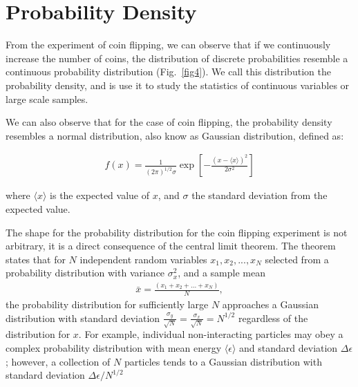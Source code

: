 \documentclass[book.tex]{subfiles}
\begin{document}
\section{Probability Density}

From the experiment of coin flipping, we can observe that if we continuously increase the number of coins, the distribution of discrete probabilities resemble a continuous probability distribution (Fig.~\ref{fig4}). We call this distribution the probability density, and is use it to study the statistics of continuous variables or large scale samples.

We can also observe that for the case of coin flipping, the probability density resembles a normal distribution, also know as Gaussian distribution, defined as:

\begin{align}\label{Eq20}
f(x) = \frac{1}{(2\pi)^{1/2}\sigma}\exp\left[-\frac{\left(x - \langle x \rangle \right)^2}{2\sigma^2}\right]
\end{align}

\noindent where $\langle x \rangle$ is the expected value of $x$, and $\sigma$ the standard deviation from the expected value.

The shape for the probability distribution for the coin flipping experiment is not arbitrary, it is a direct consequence of the central limit theorem. The theorem states that for $N$ independent random variables $x_1, x_2,..., x_N$ selected from a probability distribution with variance $\sigma^2_x$, and a sample mean 
\begin{align}\bar{x} = \frac{\left(x_1+x_2+...+x_N\right)}{N},\end{align} 
the probability distribution for sufficiently large $N$ approaches a Gaussian distribution with standard deviation $\frac{\sigma_y}{\sqrt{N}} = \frac{\sigma_x}{\sqrt{N}}=N^{1/2}$ regardless of the distribution for $x$. For example, individual non-interacting particles may obey a complex probability distribution with mean energy $\langle \epsilon \rangle$ and standard deviation $\Delta \epsilon$; however, a collection of $N$ particles tends to a Gaussian distribution with standard deviation $\Delta \epsilon/N^{1/2}$ 
\end{document}
